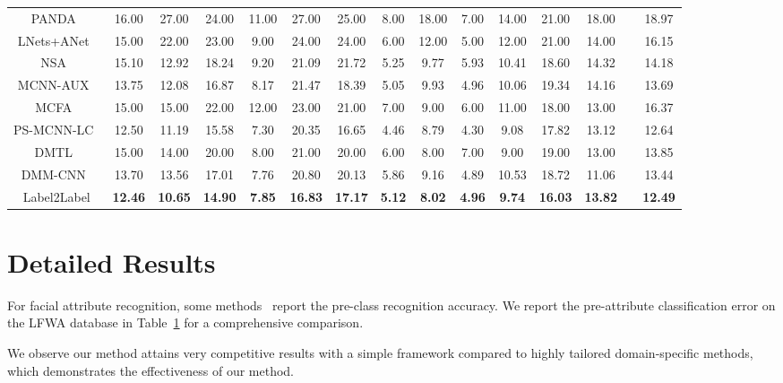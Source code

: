 \documentclass[runningheads]{llncs}
\begin{document}
\begin{table}[thbp]
{\begin{tabular}{c|c|c|c|c|c|c|c|c|c|c|c|c|c|c}
	    PANDA~\cite{zhang2014panda}  & 16.00 & 27.00 & 24.00 & 11.00 & 27.00 & 25.00 & 8.00 & 18.00 & 7.00 & 14.00 & 21.00 & 18.00 &   & 18.97
	    \\
	    LNets+ANet~\cite{liu2015deep} & 15.00 & 22.00 & 23.00 & 9.00 & 24.00 & 24.00 & 6.00 & 12.00 & 5.00 & 12.00 & 21.00 & 14.00 &   & 16.15	\\
        
        NSA~\cite{mahbub2018segment}  & 15.10 & 12.92 & 18.24 & 9.20 & 21.09 & 21.72 & 5.25 & 9.77 & 5.93 & 10.41 & 18.60 & 14.32 &   & 14.18\\	  
        
        MCNN-AUX~\cite{hand2017attributes}	 & 13.75 & 12.08 & 16.87 & 8.17 & 21.47 & 18.39 & 5.05 & 9.93 & 4.96 & 10.06 & 19.34 & 14.16 &   & 13.69	\\	
	    
       MCFA~\cite{zhuang2018multi}  & 15.00 & 15.00 & 22.00 & 12.00 & 23.00 & 21.00 & 7.00 & 9.00 & 6.00 & 11.00 & 18.00 & 13.00 &   & 16.37	\\		
       {PS-MCNN-LC~\cite{cao2018partially}} & 12.50 & 11.19 & 15.58 & 7.30 & 20.35 & 16.65 & 4.46 & 8.79 & 4.30 & 9.08 & 17.82 & 13.12 &   & 12.64\\	
       
	    DMTL~\cite{han2017heterogeneous}  & 15.00 & 14.00 & 20.00 & 8.00 & 21.00 & 20.00 & 6.00 & 8.00 & 7.00 & 9.00 & 19.00 & 13.00 &   & 13.85 	\\											
	    DMM-CNN~\cite{mao2020deep}	& 13.70 & 13.56 & 17.01 & 7.76 & 20.80 & 20.13 & 5.86 & 9.16 & 4.89 & 10.53 & 18.72 & 11.06 &   & 13.44	\\	
	    
        Label2Label  & \textbf{12.46} & \textbf{10.65} & \textbf{14.90} & \textbf{7.85} & \textbf{16.83} & \textbf{17.17} & \textbf{5.12} & \textbf{8.02} & \textbf{4.96} & \textbf{9.74} & \textbf{16.03} & \textbf{13.82}& & \textbf{12.49} \\	
		\bottomrule
	\end{tabular}}
	\label{tab:comprehensive}
\end{table}

\section{Detailed Results} 

For facial attribute recognition, some methods~\cite{mao2020deep,han2017heterogeneous} report the pre-class recognition accuracy. We report the pre-attribute classification error on the LFWA database in Table~\ref{tab:comprehensive} for a comprehensive comparison.

We observe our method attains very competitive results with a simple framework compared to highly tailored domain-specific methods, which demonstrates the effectiveness of our method.





\end{document}
